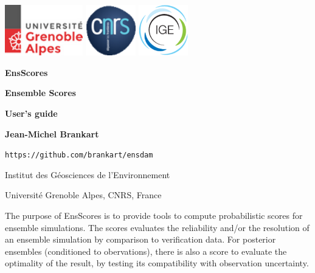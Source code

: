 \documentclass[11pt]{article}
\begin{document}
\pagestyle{empty}

\centerline{
\includegraphics[height=22mm]{Logos/logo_uga.png}
\hspace{5mm}
\includegraphics[height=22mm]{Logos/logo_cnrs.png}
\hfill
\includegraphics[height=22mm]{Logos/logo_ige.png}
}

\vspace{20mm}

\begin{center}

{\Huge\bf EnsScores}

\vspace{10mm}

{\Large\bf Ensemble Scores}

\vspace{10mm}

{\Large\bf User's guide}

\vspace{10mm}

{\large\bf Jean-Michel Brankart}

\vspace{5mm}
{\tt https://github.com/brankart/ensdam}

\vspace{5mm}
{\large Institut des G\'eosciences de l'Environnement}

\vspace{1mm}
{\large Universit\'e Grenoble Alpes, CNRS, France}

\end{center}

\vspace{20mm}
The purpose of EnsScores is to provide tools
to compute probabilistic scores for ensemble simulations.
The scores evaluates the reliability and/or the resolution of an ensemble simulation
by comparison to verification data.
For posterior ensembles (conditioned to obervations),
there is also a score to evaluate the optimality of the result,
by testing its compatibility with observation uncertainty.
\end{document}
